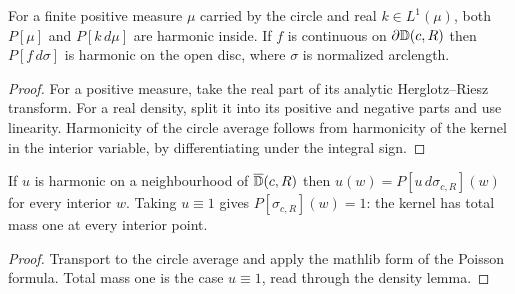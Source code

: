 \begin{theorem}
  \label{thm:harmonic_poisson_integral}
  \leanok
  For a finite positive measure $\mu$ carried by the circle and real
  $k\in L^1(\mu)$, both $P[\mu]$ and $P[k\,d\mu]$ are harmonic inside.
  If $f$ is continuous on $\partial\mathbb{D}(c,R)$ then $P[f\,d\sigma]$ is harmonic on
  the open disc, where $\sigma$ is normalized arclength.
  \begin{proof}
    \leanok
    For a positive measure, take the real part of its analytic
    Herglotz--Riesz transform. For a real density, split it into its positive
    and negative parts and use linearity.
    Harmonicity of the circle average follows from harmonicity of the kernel in
    the interior variable, by differentiating under the integral sign.
  \end{proof}
\end{theorem}

\begin{theorem}
  \label{thm:poisson_reproducing}
  \leanok
  If $u$ is harmonic on a neighbourhood of $\overline{\mathbb{D}}(c,R)$ then
  $u(w)=P[u\,d\sigma_{c,R}](w)$ for every interior $w$. Taking $u\equiv 1$ gives
  $P[\sigma_{c,R}](w)=1$: the kernel has total mass one at every interior point.
  \begin{proof}
    \leanok
    Transport to the circle average and apply the mathlib form of the Poisson
    formula. Total mass one is the case $u\equiv 1$, read through the density
    lemma.
  \end{proof}
\end{theorem}

